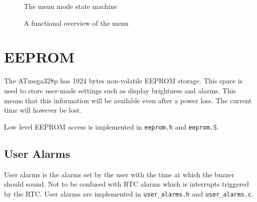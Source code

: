 \documentclass{awac02}
\begin{document}
\begin{figure}[h]
    \centering
    
    \caption{The menu mode state machine}
    \label{fig:menu-state}
\end{figure}





\begin{figure}[h]
    \centering
    
    \label{fig:menu-flowchart}
    \caption{A functional overview of the menu}
\end{figure}

\section{EEPROM}

The ATmega328p has 1024 bytes non-volatile EEPROM storage. This space is used to
store user-made settings such as display brightness and alarms. This means that
this information will be available even after a power loss. The current time
will however be lost.

Low level EEPROM access is implemented in \texttt{eeprom.h} and
\texttt{eeprom.S}.

\subsection{User Alarms}
User alarms is the alarms set by the user with the time at which the buzzer
should sound. Not to be confused with RTC alarms which is interrupts triggered
by the RTC. User alarms are implemented
in \texttt{user\_alarms.h} and \texttt{user\_alarms.c}.
\end{document}
